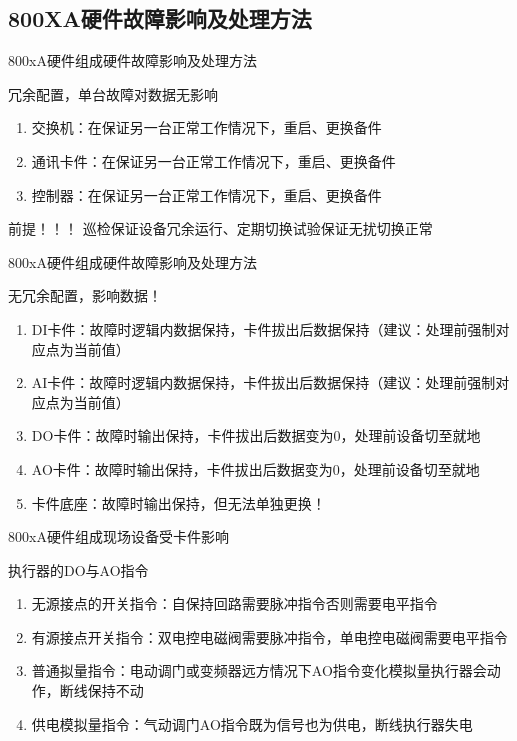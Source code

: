 \documentclass[12pt,hyperref={CJKbookmarks=true}]{beamer} %
\begin{document}
\subsection{800XA硬件故障影响及处理方法}
\begin{frame}{800xA硬件组成}{硬件故障影响及处理方法}
\begin{block}{冗余配置，单台故障对数据无影响}
			\begin{enumerate}
				\item 交换机：在保证另一台正常工作情况下，重启、更换备件
				
				\item   通讯卡件：在保证另一台正常工作情况下，重启、更换备件
				
				\item  控制器：在保证另一台正常工作情况下，重启、更换备件

			\end{enumerate}
		\end{block}
\pause
\begin{alertblock}{\heiti 前提！！！}
			巡检保证设备冗余运行、定期切换试验保证无扰切换正常
		\end{alertblock}
\end{frame}
\begin{frame}{800xA硬件组成}{硬件故障影响及处理方法}
\begin{alertblock}{\heiti 无冗余配置，影响数据！}
			\begin{enumerate}
				\item  DI卡件：故障时逻辑内数据保持，卡件拔出后数据保持（建议：处理前强制对应点为当前值）
				
				\item   AI卡件：故障时逻辑内数据保持，卡件拔出后数据保持（建议：处理前强制对应点为当前值）
				
				\item  DO卡件：故障时输出保持，卡件拔出后数据变为0，处理前设备切至就地
				
				\item  AO卡件：故障时输出保持，卡件拔出后数据变为0，处理前设备切至就地
				
				\item  卡件底座：故障时输出保持，但无法单独更换！
			\end{enumerate}
		\end{alertblock}
\end{frame}
\begin{frame}{800xA硬件组成}{现场设备受卡件影响}
\begin{block}{\heiti 执行器的DO与AO指令}
			\begin{enumerate}
				\item  无源接点的开关指令：自保持回路需要脉冲指令否则需要电平指令
				\item  有源接点开关指令：双电控电磁阀需要脉冲指令，单电控电磁阀需要电平指令
				\item  普通拟量指令：电动调门或变频器远方情况下AO指令变化模拟量执行器会动作，断线保持不动
				\item  供电模拟量指令：气动调门AO指令既为信号也为供电，断线执行器失电
		\end{enumerate}
		\end{block}
\end{frame}
\end{document}
